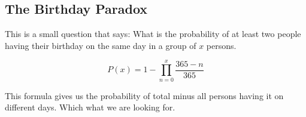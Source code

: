 \subsection{The Birthday Paradox}

This is a small question that says: What is the probability of at least two people having 
their birthday on the same day in a group of \(x\) persons.

\[
    P(x) = 1 - \prod_{n = 0}^{x} \frac{365 - n}{365}
\]

This formula gives us the probability of total minus all persons having it on different days. Which
what we are looking for.